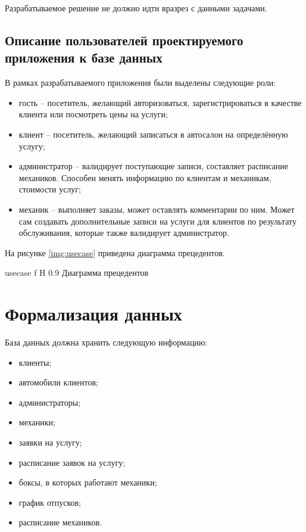 Разрабатываемое решение не должно идти вразрез с данными задачами. 

\subsection{Описание пользователей проектируемого приложения к базе данных}

В рамках разрабатываемого приложения были выделены следующие роли:

\begin{itemize}
	\item гость -- посетитель, желающий авторизоваться, зарегистрироваться в качестве клиента или посмотреть цены на услуги;
	\item клиент -- посетитель, желающий записаться в автосалон на определённую услугу;
	\item администратор -- валидирует поступающие записи, составляет расписание механиков. Способен менять информацию по клиентам и механикам, стоимости услуг;
	\item механик -- выполняет заказы, может оставлять комментарии по ним. Может сам создавать дополнительные записи на услуги для клиентов по результату обслуживания, которые также валидирует администратор.
\end{itemize}

На рисунке \ref{img:usecase} приведена диаграмма прецедентов.

{usecase}
{f}
{H}
{0.9\textwidth}
{Диаграмма прецедентов}

\section{Формализация данных}

База данных должна хранить следующую информацию:

\begin{itemize}
	\item клиенты;
	\item автомобили клиентов;
	\item администраторы;
	\item механики;
	\item заявки на услугу;
	\item расписание заявок на услугу;
	\item боксы, в которых работают механики;
	\item график отпусков;
	\item расписание механиков.
\end{itemize}

